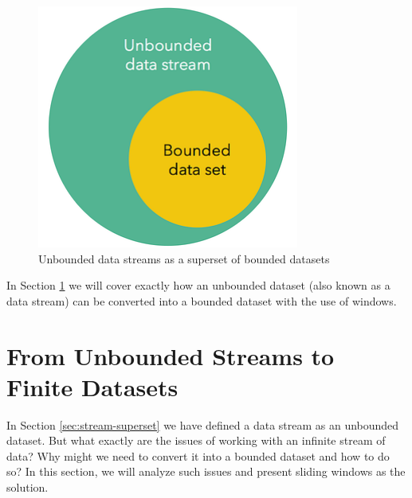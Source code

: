 \begin{figure}[!htb]
    \begin{center}
      \includegraphics[scale=0.5]{figures/unbounded-superset-bounded.png}
      \caption[Unbounded data streams as a superset of bounded datasets]{Unbounded data streams as a superset of bounded datasets \cite{batch-is-a-special-case-of-streaming}}
      \label{fig:unbounded-bounded-superset}
    \end{center}
\end{figure}


In Section \ref{sec:windows} we will cover exactly how an unbounded dataset (also known as a data stream) can be converted into a bounded dataset with the use of windows.

\section{From Unbounded Streams to Finite Datasets} \label{sec:windows}

In Section \ref{sec:stream-superset} we have defined a data stream as an unbounded dataset. But what exactly are the issues of working with an infinite stream of data? Why might we need to convert it into a bounded dataset and how to do so? In this section, we will analyze such issues and present sliding windows as the solution.

